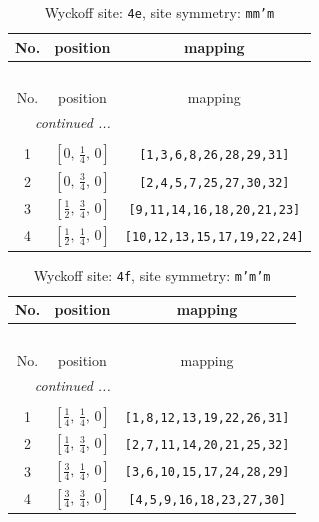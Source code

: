 \documentclass[fleqn,8pt]{jsarticle}
\begin{document}
\renewcommand{\arraystretch}{1.2}
\begin{longtable}{ccc}
\caption{Wyckoff site: {\tt 4e}, site symmetry: {\tt mm'm}}
 \\
 \hline \hline
No. & position & mapping \\ \hline \endfirsthead

\multicolumn{2}{l}{\tablename\ \thetable{}} \\
 \hline \hline
No. & position & mapping \\ \hline \endhead

 \hline \hline
\multicolumn{2}{r}{\footnotesize\it continued ...} \\ \endfoot

 \hline \hline
\multicolumn{2}{r}{} \\ \endlastfoot

1 & $\left[ 0,\, \frac{1}{4},\, 0 \right]$ & {\tt [1,3,6,8,26,28,29,31]} \\ \hline
2 & $\left[ 0,\, \frac{3}{4},\, 0 \right]$ & {\tt [2,4,5,7,25,27,30,32]} \\ \hline
3 & $\left[ \frac{1}{2},\, \frac{3}{4},\, 0 \right]$ & {\tt [9,11,14,16,18,20,21,23]} \\ \hline
4 & $\left[ \frac{1}{2},\, \frac{1}{4},\, 0 \right]$ & {\tt [10,12,13,15,17,19,22,24]} \\
\end{longtable}
\renewcommand{\arraystretch}{1.2}
\begin{longtable}{ccc}
\caption{Wyckoff site: {\tt 4f}, site symmetry: {\tt m'm'm}}
 \\
 \hline \hline
No. & position & mapping \\ \hline \endfirsthead

\multicolumn{2}{l}{\tablename\ \thetable{}} \\
 \hline \hline
No. & position & mapping \\ \hline \endhead

 \hline \hline
\multicolumn{2}{r}{\footnotesize\it continued ...} \\ \endfoot

 \hline \hline
\multicolumn{2}{r}{} \\ \endlastfoot

1 & $\left[ \frac{1}{4},\, \frac{1}{4},\, 0 \right]$ & {\tt [1,8,12,13,19,22,26,31]} \\ \hline
2 & $\left[ \frac{1}{4},\, \frac{3}{4},\, 0 \right]$ & {\tt [2,7,11,14,20,21,25,32]} \\ \hline
3 & $\left[ \frac{3}{4},\, \frac{1}{4},\, 0 \right]$ & {\tt [3,6,10,15,17,24,28,29]} \\ \hline
4 & $\left[ \frac{3}{4},\, \frac{3}{4},\, 0 \right]$ & {\tt [4,5,9,16,18,23,27,30]} \\
\end{longtable}
\end{document}

